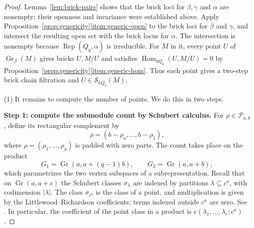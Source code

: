 \documentclass[a4paper,reqno,10pt]{amsart}
\theoremstyle{definition}
\numberwithin{equation}{section}
\newcommand{\Hom}{\operatorname{Hom}}
\newcommand{\Gr}{\operatorname{Gr}}
\newcommand{\Rep}{\operatorname{Rep}}
\newcommand{\Sol}{\mathcal S}
\newcommand{\parts}{\mathcal P}
\begin{document}
\begin{proof}
Lemma~\ref{lem:brick-pairs} shows that the brick loci for
$\beta,\gamma$ and $\alpha$ are nonempty; their openness and invariance
were established above. Apply Proposition~\ref{prop:genericity}\ref{item:generic-open} to
the brick loci for $\beta$ and $\gamma$, and intersect the resulting
open set with the brick locus for $\alpha$. The intersection is nonempty
because $\Rep(Q_q,\alpha)$ is irreducible. For $M$ in it, every point
$U$ of $\Gr_\beta(M)$ gives bricks $U,M/U$ and satisfies
$\Hom_{k Q_q}(U,M/U)=0$ by Proposition~\ref{prop:genericity}\ref{item:generic-hom}.
Thus each point gives a two-step brick chain filtration and
$U\in\Sol_{k Q_q}(M)$.

(1) It remains to compute the number of points. We do this in two steps.

\textbf{Step 1: compute the submodule count by Schubert calculus.}
For $\rho\in\parts_{a,b}$, define its rectangular complement by
\[
 \overline\rho=(b-\rho_a,\ldots,b-\rho_1),
\]
where $\rho=(\rho_1,\ldots,\rho_a)$ is padded with zero parts.
The count takes place on the product
\[
 G_1=\Gr(a,a+(q-1)b),\qquad G_2=\Gr(a,a+b),
\]
which parametrizes the two vertex subspaces of a subrepresentation.
Recall that on $\Gr(a,a+c)$ the Schubert classes $\sigma_\lambda$
are indexed by partitions $\lambda\subseteq c^a$, with codimension
$|\lambda|$. The class $\sigma_{c^a}$ is the class of a point, and
multiplication is given by the Littlewood--Richardson coefficients;
terms indexed outside $c^a$ are zero. See \cite[Sections~1 and~3]{DSW}.
In particular, the coefficient
of the point class in a product is $c(\lambda_1,\ldots,\lambda_r;c^a)$.


\end{proof}
\end{document}
